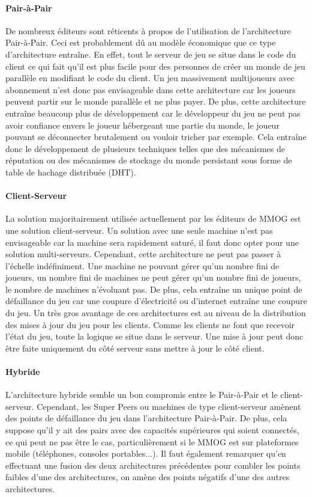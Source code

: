 \paragraph{Pair-à-Pair\\}
De nombreux éditeurs sont réticents à propos de l'utilisation de l'architecture Pair-à-Pair. Ceci est probablement dû au modèle économique que ce type d'architecture entraîne. En effet, tout le serveur de jeu se situe dans le code du client ce qui fait qu'il est plus facile pour des personnes de créer un monde de jeu parallèle en modifiant le code du client. Un jeu massivement multijoueurs avec abonnement n'est donc pas envisageable dans cette architecture car les joueurs peuvent partir sur le monde parallèle et ne plus payer. De plus, cette architecture entraîne beaucoup plus de développement car le développeur du jeu ne peut pas avoir confiance envers le joueur hébergeant une partie du monde, le joueur pouvant se déconnecter brutalement ou vouloir tricher par exemple. Cela entraîne donc le développement de plusieurs techniques telles que des mécanismes de réputation ou des mécanismes de stockage du monde persistant sous forme de table de hachage distribuée (DHT).

\paragraph{Client-Serveur\\}
La solution majoritairement utilisée actuellement par les éditeurs de MMOG est une solution client-serveur. Un solution avec une seule machine n'est pas envisageable car la machine sera rapidement saturé, il faut donc opter pour une solution multi-serveurs. Cependant, cette architecture ne peut pas passer à l'échelle indéfiniment. Une machine ne pouvant gérer qu'un nombre fini de joueurs, un nombre fini de machines ne peut gérer qu'un nombre fini de joueurs, le nombre de machines n'évoluant pas. De plus, cela entraîne un unique point de défaillance du jeu car une coupure d'électricité ou d'internet entraîne une coupure du jeu. Un très gros avantage de ces architectures est au niveau de la distribution des mises à jour du jeu pour les clients. Comme les clients ne font que recevoir l'état du jeu, toute la logique se situe dans le serveur. Une mise à jour peut donc être faite uniquement du côté serveur sans mettre à jour le côté client.

\paragraph{Hybride\\}
L'architecture hybride semble un bon compromis entre le Pair-à-Pair et le client-serveur. Cependant, les Super Peers ou machines de type client-serveur amènent des points de défaillance du jeu dans l'architecture Pair-à-Pair. De plus, cela suppose qu'il y ait des pairs avec des capacités supérieures qui soient connectés, ce qui peut ne pas être le cas, particulièrement si le MMOG est sur plateformes mobile (téléphones, consoles portables...). Il faut également remarquer qu'en effectuant une fusion des deux architectures précédentes pour combler les points faibles d'une des architectures, on amène des points négatifs d'une des autres architectures.

